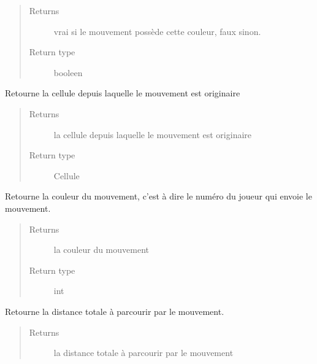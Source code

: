 \documentclass[letterpaper,10pt,english]{sphinxmanual}
\begin{document}
\begin{fulllineitems}
\begin{fulllineitems}
\begin{quote}
\begin{description}
\item[{Returns}] \leavevmode
vrai si le mouvement possède cette couleur, faux sinon.

\item[{Return type}] \leavevmode
booleen

\end{description}\end{quote}

\end{fulllineitems}


\begin{fulllineitems}
\label{index:Mouvement.Mouvement.fromCellule}
Retourne la cellule depuis laquelle le mouvement est originaire
\begin{quote}\begin{description}
\item[{Returns}] \leavevmode
la cellule depuis laquelle le mouvement est originaire

\item[{Return type}] \leavevmode
Cellule

\end{description}\end{quote}

\end{fulllineitems}


\begin{fulllineitems}
\label{index:Mouvement.Mouvement.getCouleur}
Retourne la couleur du mouvement, c'est à dire le numéro du joueur qui envoie le mouvement.
\begin{quote}\begin{description}
\item[{Returns}] \leavevmode
la couleur du mouvement

\item[{Return type}] \leavevmode
int

\end{description}\end{quote}

\end{fulllineitems}


\begin{fulllineitems}
\label{index:Mouvement.Mouvement.getDistance}
Retourne la distance totale à parcourir par le mouvement.
\begin{quote}\begin{description}
\item[{Returns}] \leavevmode
la distance totale à parcourir par le mouvement


\end{description}
\end{quote}
\end{fulllineitems}
\end{fulllineitems}
\end{document}
